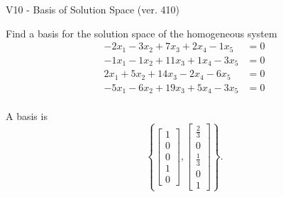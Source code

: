\begin{exercise}
  \begin{exerciseTitle}V10 - Basis of Solution Space (ver. 410)\end{exerciseTitle}
  \begin{exerciseStatement}
    Find a basis for the solution space of the homogeneous system 
\begin{align*}
 -2 x_ 1 -3 x_ 2 + 7 x_ 3 + 2 x_ 4 -1 x_ 5 &= 0  \\ 
  -1 x_ 1 -1 x_ 2 + 11 x_ 3 + 1 x_ 4 -3 x_ 5 &= 0  \\ 
  2 x_ 1 + 5 x_ 2 + 14 x_ 3 -2 x_ 4 -6 x_ 5 &= 0  \\ 
  -5 x_ 1 -6 x_ 2 + 19 x_ 3 + 5 x_ 4 -3 x_ 5 &= 0  \\ 
 \end{align*}


 
  \end{exerciseStatement}

  \begin{exerciseAnswer}
   A basis is   
\[\left\{\left[\begin{array}{c}
1 \\
0 \\
0 \\
1 \\
0
\end{array}\right] , \left[\begin{array}{c}
\frac{2}{3} \\
0 \\
\frac{1}{3} \\
0 \\
1
\end{array}\right]\right\}.\]

  


  \end{exerciseAnswer}
\end{exercise}
